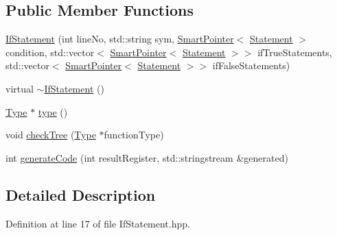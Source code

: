 \subsection*{Public Member Functions}
\begin{DoxyCompactItemize}
\item 
\hyperlink{class_scribble_core_1_1_if_statement_aaf95d7fc41a09df4f13d91a36bb6ce88}{If\-Statement} (int line\-No, std\-::string sym, \hyperlink{_smart_pointer_8hpp_afdd8d4ba81c3fcbdeacf1dafba2accfb}{Smart\-Pointer}$<$ \hyperlink{class_scribble_core_1_1_statement}{Statement} $>$ condition, std\-::vector$<$ \hyperlink{_smart_pointer_8hpp_afdd8d4ba81c3fcbdeacf1dafba2accfb}{Smart\-Pointer}$<$ \hyperlink{class_scribble_core_1_1_statement}{Statement} $>$$>$ if\-True\-Statements, std\-::vector$<$ \hyperlink{_smart_pointer_8hpp_afdd8d4ba81c3fcbdeacf1dafba2accfb}{Smart\-Pointer}$<$ \hyperlink{class_scribble_core_1_1_statement}{Statement} $>$$>$ if\-False\-Statements)
\item 
virtual \hyperlink{class_scribble_core_1_1_if_statement_aba9d4feb2f79d8ad4a8cec5d75ffe40b}{$\sim$\-If\-Statement} ()
\item 
\hyperlink{class_scribble_core_1_1_type}{Type} $\ast$ \hyperlink{class_scribble_core_1_1_if_statement_af5d5d3cc9c33f6879d254f11c2bec9eb}{type} ()
\item 
void \hyperlink{class_scribble_core_1_1_if_statement_ade8ad73c43528ea7bc0fbf37f4380be8}{check\-Tree} (\hyperlink{class_scribble_core_1_1_type}{Type} $\ast$function\-Type)
\item 
int \hyperlink{class_scribble_core_1_1_if_statement_ac002e4a9ab0324d7168ad19aa7fc2369}{generate\-Code} (int result\-Register, std\-::stringstream \&generated)
\end{DoxyCompactItemize}


\subsection{Detailed Description}


Definition at line 17 of file If\-Statement.\-hpp.



